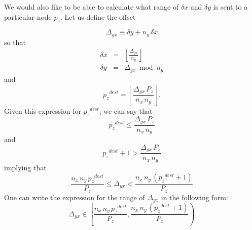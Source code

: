 \documentclass[pdftex,finalversion,simpleeqnnos,titlepage,12pt]{article}
\newcommand{\nodecount}{\ensuremath{P}}
\newcommand{\nodemeshsize}[1]{\ensuremath{\nodecount_{#1}}}
\newcommand{\nodecoord}[1]{\ensuremath{p_{#1}}}
\newcommand{\meshpernode}[1]{\ensuremath{n_{#1}}}
\newcommand{\offset}[2]{\ensuremath{\Delta_{#1#2}}}
\begin{document}
We would also like to be able to calculate what range of $\delta x$
and $\delta y$ is sent to a particular node $\nodecoord{z}$.  Let us
define the offset

\begin{equation}
\offset{y}{x} \equiv \delta y + \meshpernode{y}\,\delta x \label{eqn:delta_def_xy}
\end{equation}
so that
\begin{eqnarray}
\delta x & = & \left\lfloor
\frac{\offset{y}{x}}{\meshpernode{y}} \right\rfloor \label{eqn:def_delta_x} \\
\delta y & = & \offset{y}{x} \bmod \meshpernode{y} \label{eqn:def_delta_y}
\end{eqnarray}
and
\begin{displaymath}
\nodecoord{z}^{dest} = \left\lfloor
\frac{\offset{y}{x}\,\nodemeshsize{z} }{\meshpernode{x}\,\meshpernode{y}}\right\rfloor.
\end{displaymath}
Given this expression for $\nodecoord{z}^{dest}$, we can say that
\begin{displaymath}
\nodecoord{z}^{dest} \leq
\frac{\offset{y}{x}\,\nodemeshsize{z}}{\meshpernode{x}\,\meshpernode{y}}
\end{displaymath}
and
\begin{displaymath}
\nodecoord{z}^{dest} + 1 >
\frac{\offset{y}{x}\,\nodemeshsize{z}}{\meshpernode{x}\,\meshpernode{y}}
\end{displaymath}
implying that
\begin{equation}
\frac{\meshpernode{x}\,\meshpernode{y}\,\nodecoord{z}^{dest}}{\nodemeshsize{z}}
\leq \offset{y}{x} <
\frac{\meshpernode{x}\,\meshpernode{y}\,(\nodecoord{z}^{dest} +
1)}{\nodemeshsize{z}} 
\end{equation}
One can write the expression for the range of $\offset{y}{x}$ in the following
form:
\begin{equation}
\offset{y}{x} \in \left [ 
  \frac{\meshpernode{x}\,\meshpernode{y} \, \nodecoord{z}^{dest}}{\nodemeshsize{z}},
\frac{\meshpernode{x}\,\meshpernode{y}\,(\nodecoord{z}^{dest} +
1)}{\nodemeshsize{z}}
\right )\label{eqn:delta_range_xy}
\end{equation}
\end{document}
